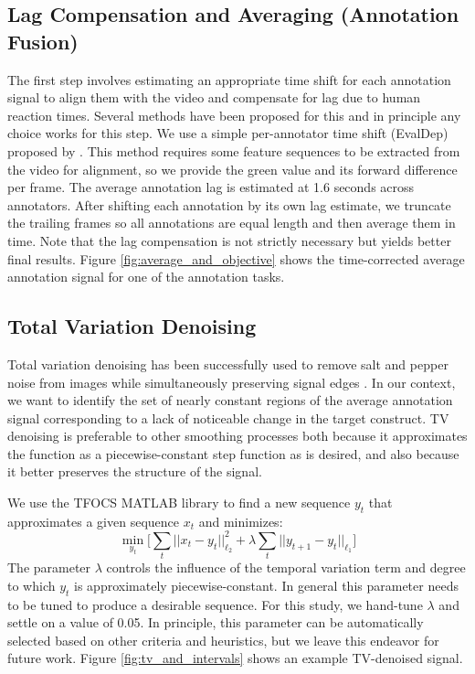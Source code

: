 \documentclass[times,twocolumn,final,authoryear]{elsarticle}
\begin{document}
\subsection{Lag Compensation and Averaging (Annotation Fusion)}
The first step involves estimating an appropriate time shift for each annotation signal to align them with the video and compensate for lag due to human reaction times.  Several methods have been proposed for this \citep{DTW2007, CTW2009, andrew2013deep, nicolaou2014dynamic, Mariooryad2015, Ringeval2015, trigeorgis2016deep} and in principle any choice works for this step.  We use a simple per-annotator time shift (EvalDep) proposed by \cite{Mariooryad2015}.  This method requires some feature sequences to be extracted from the video for alignment, so we provide the green value and its forward difference per frame.  The average annotation lag is estimated at 1.6 seconds across annotators.  After shifting each annotation by its own lag estimate, we truncate the trailing frames so all annotations are equal length and then average them in time.  Note that the lag compensation is not strictly necessary but yields better final results. Figure \ref{fig:average_and_objective} shows the time-corrected average annotation signal for one of the annotation tasks.

\subsection{Total Variation Denoising}
Total variation denoising has been successfully used to remove salt and pepper noise from images while simultaneously preserving signal edges \citep{rudin1992nonlinear}.  In our context, we want to identify the set of nearly constant regions of the average annotation signal corresponding to a lack of noticeable change in the target construct.  TV denoising is preferable to other smoothing processes both because it approximates the function as a piecewise-constant step function as is desired, and also because it better preserves the structure of the signal.

We use the TFOCS MATLAB library \citep{becker2011templates} to find a new sequence $y_t$ that approximates a given sequence $x_t$ and minimizes:
\begin{equation*}
\min_{y_t} \Big[\sum_{t} ||x_t - y_t||_{\ell_2}^2 + \lambda\sum_{t} ||y_{t+1} - y_{t}||_{\ell_1}\Big]
\end{equation*}
The parameter $\lambda$ controls the influence of the temporal variation term and degree to which $y_t$ is approximately piecewise-constant.  In general this parameter needs to be tuned to produce a desirable sequence.  For this study, we hand-tune $\lambda$ and settle on a value of 0.05.  In principle, this parameter can be automatically selected based on other criteria and heuristics, but we leave this endeavor for future work.  Figure \ref{fig:tv_and_intervals} shows an example TV-denoised signal.
\end{document}

